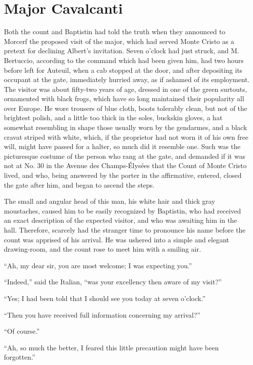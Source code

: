 \chapter{Major Cavalcanti}

Both the count and Baptistin had told the truth when they announced to
Morcerf the proposed visit of the major, which had served Monte Cristo
as a pretext for declining Albert’s invitation. Seven o’clock had just
struck, and M. Bertuccio, according to the command which had been given
him, had two hours before left for Auteuil, when a cab stopped at the
door, and after depositing its occupant at the gate, immediately
hurried away, as if ashamed of its employment. The visitor was about
fifty-two years of age, dressed in one of the green surtouts,
ornamented with black frogs, which have so long maintained their
popularity all over Europe. He wore trousers of blue cloth, boots
tolerably clean, but not of the brightest polish, and a little too
thick in the soles, buckskin gloves, a hat somewhat resembling in shape
those usually worn by the gendarmes, and a black cravat striped with
white, which, if the proprietor had not worn it of his own free will,
might have passed for a halter, so much did it resemble one. Such was
the picturesque costume of the person who rang at the gate, and
demanded if it was not at No. 30 in the Avenue des Champs-Élysées that
the Count of Monte Cristo lived, and who, being answered by the porter
in the affirmative, entered, closed the gate after him, and began to
ascend the steps.

The small and angular head of this man, his white hair and thick gray
moustaches, caused him to be easily recognized by Baptistin, who had
received an exact description of the expected visitor, and who was
awaiting him in the hall. Therefore, scarcely had the stranger time to
pronounce his name before the count was apprised of his arrival. He was
ushered into a simple and elegant drawing-room, and the count rose to
meet him with a smiling air.

“Ah, my dear sir, you are most welcome; I was expecting you.”

“Indeed,” said the Italian, “was your excellency then aware of my
visit?”

“Yes; I had been told that I should see you today at seven o’clock.”

“Then you have received full information concerning my arrival?”

“Of course.”

“Ah, so much the better, I feared this little precaution might have
been forgotten.”


